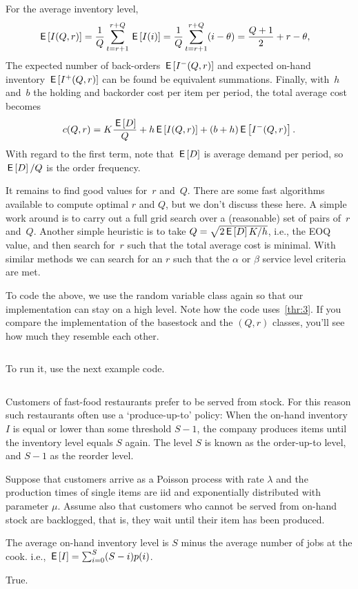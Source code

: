\documentclass[stochastic-or.tex]{subfiles}
\begin{document}
For the average inventory level,
\begin{align*}
   \,\mathsf{E}\left[I(Q,r)\right]
   &= \frac1Q\sum_{t=r+1}^{r+Q} \,\mathsf{E}\left[I(i)\right]
     = \frac1Q\sum_{t=r+1}^{r+Q} (i - \theta)
   = \frac{Q+1}2 + r - \theta,
\end{align*}
The  expected number of back-orders $\,\mathsf{E}\left[I^-(Q,r)\right]$ and expected on-hand inventory $\,\mathsf{E}\left[I^+(Q,r)\right]$ can be found be equivalent summations.
Finally, with~$h$ and~$b$ the holding and backorder cost per item per period,  the total average cost becomes
\begin{equation*}
c(Q,r) = K\frac{\,\mathsf{E}\left[D\right]}{Q} + h \,\mathsf{E}\left[I(Q,r)\right] +  (b+h) \,\mathsf{E}\left[I^-(Q,r)\right].
\end{equation*}
With regard to the first term, note that $\,\mathsf{E}\left[D\right]$ is average demand per period, so $\,\mathsf{E}\left[D\right] / Q$ is the order frequency.


It remains to find good values for~$r$ and~$Q$.
There are some fast algorithms available to compute optimal $r$ and $Q$, but  we don't discuss these here.
A simple work around is to carry out a full grid search over a (reasonable) set of pairs of~$r$ and~$Q$.
Another simple heuristic is to take $Q=\sqrt{2\,\mathsf{E}\left[D\right]K/h}$, i.e., the EOQ value, and then search for~$r$ such that the total average cost is minimal.
With similar methods we can search for an $r$ such that the $\alpha$ or $\beta$ service level criteria are met.

To code the above, we use the random variable class again so that our  implementation can stay on a high level. Note how the code uses~\cref{thr:3}.
If you compare the implementation of the basestock and the $(Q,r)$ classes, you'll see how much they resemble each other.
\inputminted[firstline=78, lastline=114]{python}{../code/lighthouse.py} %
To run it, use the next example code.
\inputminted[firstline=121, lastline=124]{python}{../code/lighthouse.py} %


\begin{truefalse}
Customers of fast-food restaurants prefer to be served from stock.
For this reason such restaurants often use a `produce-up-to' policy: When the on-hand inventory $I$ is equal or lower than some threshold $S-1$, the company produces items until the inventory level equals $S$ again.
The level $S$ is known as the order-up-to level, and $S-1$ as the reorder level.

Suppose that customers arrive as a Poisson process with rate $\lambda$
and the production times of single items are iid and exponentially
distributed with parameter $\mu$. Assume also that customers who
cannot be served from on-hand stock are backlogged, that is, they wait
until their item has been produced.

The average on-hand inventory level is $S$ minus the average number of jobs at the cook. i.e., $\,\mathsf{E}\left[I\right] = \sum_{i=0}^{S} (S-i) p(i)$.
\begin{solution}
True.
\end{solution}
\end{truefalse}
\end{document}
